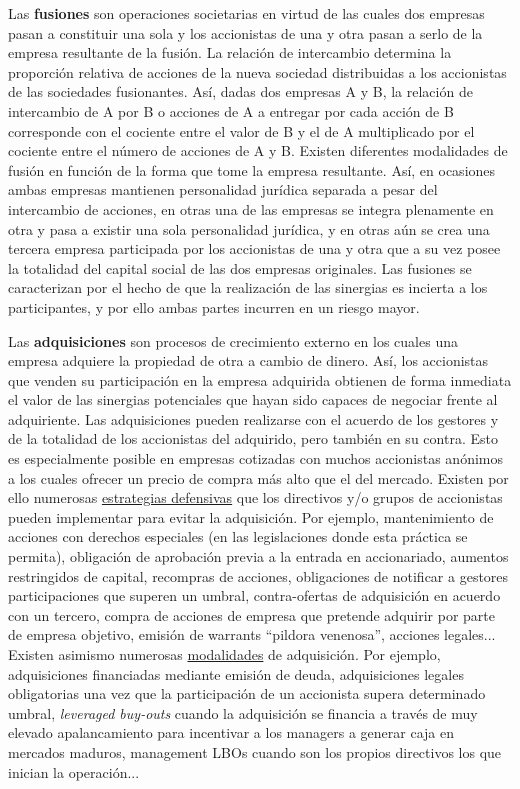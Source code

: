 \documentclass{nuevotema}
\begin{document}
Las \textbf{fusiones} son operaciones societarias en virtud de las cuales dos empresas pasan a constituir una sola y los accionistas de una y otra pasan a serlo de la empresa resultante de la fusión.  La relación de intercambio determina la proporción relativa de acciones de la nueva sociedad distribuidas a los accionistas de las sociedades fusionantes. Así, dadas dos empresas A y B, la relación de intercambio de A por B o  acciones de A a entregar por cada acción de B corresponde con el cociente entre el valor de B y el de A multiplicado por el cociente entre el número de acciones de A y B. Existen diferentes modalidades de fusión en función de la forma que tome la empresa resultante. Así, en ocasiones ambas empresas mantienen personalidad jurídica separada a pesar del intercambio de acciones, en otras una de las empresas se integra plenamente en otra y pasa a existir una sola personalidad jurídica, y en otras aún se crea una tercera empresa participada por los accionistas de una y otra que a su vez posee la totalidad del capital social de las dos empresas originales. Las fusiones se caracterizan por el hecho de que la realización de las sinergias es incierta a los participantes, y por ello ambas partes incurren en un riesgo mayor.

Las \textbf{adquisiciones} son procesos de crecimiento externo en los cuales una empresa adquiere la propiedad de otra a cambio de dinero. Así, los accionistas que venden su participación en la empresa adquirida obtienen de forma inmediata el valor de las sinergias potenciales que hayan sido capaces de negociar frente al adquiriente. Las adquisiciones pueden realizarse con el acuerdo de los gestores y de la totalidad de los accionistas del adquirido, pero también en su contra. Esto es especialmente posible en empresas cotizadas con muchos accionistas anónimos a los cuales ofrecer un precio de compra más alto que el del mercado. Existen por ello numerosas \underline{estrategias defensivas} que los directivos y/o grupos de accionistas pueden implementar para evitar la adquisición. Por ejemplo, mantenimiento de acciones con derechos especiales (en las legislaciones donde esta práctica se permita), obligación de aprobación previa a la entrada en accionariado, aumentos restringidos de capital, recompras de acciones, obligaciones de notificar a gestores participaciones que superen un umbral, contra-ofertas de adquisición en acuerdo con un tercero, compra de acciones de empresa que pretende adquirir por parte de empresa objetivo, emisión de warrants ``pildora venenosa'', acciones legales... Existen asimismo numerosas \underline{modalidades} de adquisición. Por ejemplo, adquisiciones financiadas mediante emisión de deuda, adquisiciones legales obligatorias una vez que la participación de un accionista supera determinado umbral, \textit{leveraged buy-outs} cuando la adquisición se financia a través de muy elevado apalancamiento para incentivar a los managers a generar caja en mercados maduros, management LBOs cuando son los propios directivos los que inician la operación...
\end{document}
